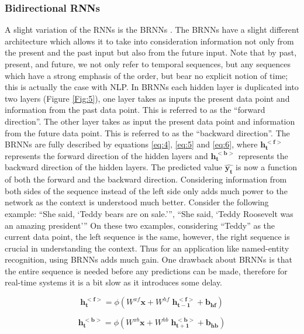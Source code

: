 \subsubsection{Bidirectional RNNs}
\label{bg:subsub3}
A slight variation of the \ac{RNNs} is the \ac{BRNNs} \cite{schuster1997bidirectional}. The \ac{BRNNs} have a slight different architecture which allows it to take into consideration information not only from the present and the past input but also from the future input. Note that by past, present, and future, we not only refer to temporal sequences, but any sequences which have a strong emphasis of the order, but bear no explicit notion of time; this is actually the case with \ac{NLP}. In \ac{BRNNs} each hidden layer is duplicated into two layers (Figure \ref{Fig:5}), one layer takes as inputs the present data point and information from the past data point. This is referred to as the \enquote{forward direction}. The other layer takes as input the present data point and information from the future data point. This is referred to as the \enquote{backward direction}. The \ac{BRNNs} are fully described by equations \ref{eq:4}, \ref{eq:5} and \ref{eq:6}, where $ \mathbf{h_t^{<f>}} $ represents the forward direction of the hidden layers and $ \mathbf{h_t^{<b>}} $ represents the backward direction of the hidden layers. The predicted value $ \mathbf{\widehat{y_t}} $ is now a function of both the forward and the backward direction. Considering information from both sides of the sequence instead of the left side only adds much power to the network as the context is understood much better. Consider the following example: \enquote{She said, \enquote{Teddy bears are on sale.}}, \enquote{She said, \enquote{Teddy Roosevelt was an amazing president}} On these two examples, considering \enquote{Teddy} as the current data point, the left sequence is the same, however, the right sequence is crucial in understanding the context. Thus for an application like named-entity recognition, using \ac{BRNNs} adds much gain. One drawback about \ac{BRNNs} is that the entire sequence is needed before any predictions can be made, therefore for real-time systems it is a bit slow as it introduces some delay.

\begin{equation}
\label{eq:4}
\mathbf{h_t^{<f>}} = \phi(W^{xf} \mathbf{x} + W^{hf} \; \mathbf{h_{t-1}^{<f>}} + \mathbf{b_{hf}})
\end{equation}

\begin{equation}
\label{eq:5}
\mathbf{h_t^{<b>}} = \phi(W^{xb} \mathbf{x} + W^{hb} \; \mathbf{h_{t+1}^{<b>}} + \mathbf{b_{hb}})
\end{equation}

